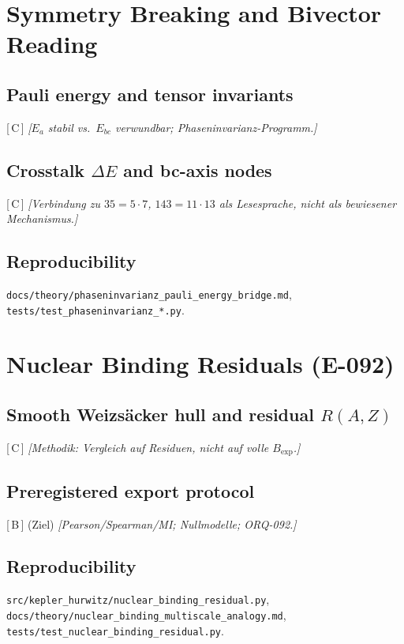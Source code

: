\documentclass[11pt,a4paper]{article}
\newcommand{\evidence}[1]{\textnormal{[\,#1\,]}}
\newcommand{\placeholder}[1]{\textit{[#1]}}
\newcommand{\repo}[1]{\texttt{#1}}
\begin{document}
\section{Symmetry Breaking and Bivector Reading}
\label{sec:symmetry}

\subsection{Pauli energy and tensor invariants}
\evidence{C}
\placeholder{$E_a$ stabil vs.\ $E_{bc}$ verwundbar; Phaseninvarianz-Programm.}

\subsection{Crosstalk $\Delta E$ and bc-axis nodes}
\evidence{C}
\placeholder{Verbindung zu $35{=}5{\cdot}7$, $143{=}11{\cdot}13$ als \emph{Lesesprache},
nicht als bewiesener Mechanismus.}

\subsection{Reproducibility}
\repo{docs/theory/phaseninvarianz_pauli_energy_bridge.md},
\repo{tests/test_phaseninvarianz_*.py}.

\section{Nuclear Binding Residuals (E-092)}
\label{sec:nuclear}

\subsection{Smooth Weizs\"acker hull and residual $R(A,Z)$}
\evidence{C}
\placeholder{Methodik: Vergleich auf Residuen, nicht auf volle $B_{\mathrm{exp}}$.}

\subsection{Preregistered export protocol}
\evidence{B} (Ziel)
\placeholder{Pearson/Spearman/MI; Nullmodelle; ORQ-092.}

\subsection{Reproducibility}
\repo{src/kepler_hurwitz/nuclear_binding_residual.py},
\repo{docs/theory/nuclear_binding_multiscale_analogy.md},
\repo{tests/test_nuclear_binding_residual.py}.
\end{document}
